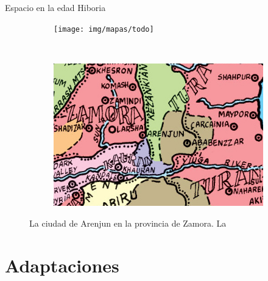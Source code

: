 \begin{frame}{Espacio en la edad Hiboria}
	\begin{figure}[htp]
		\centering
		\begin{subfigure}[b]{0.48\textwidth}
			\texttt{[image: img/mapas/todo]}
		\end{subfigure}
		~
		\begin{subfigure}[b]{0.48\textwidth}
			\includegraphics[width=\textwidth]{img/mapas/inset}
		\end{subfigure}
		\caption{La ciudad de Arenjun en la provincia de Zamora. La }
	\end{figure}
\end{frame}
\note[itemize]{
	\item
}

\section{Adaptaciones}
\note[itemize]{
	\item
}

